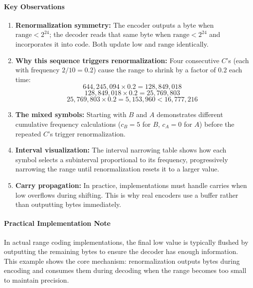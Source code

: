 \paragraph{Key Observations}

\begin{enumerate}
    \item \textbf{Renormalization symmetry:} The encoder outputs a byte when $\text{range} < 2^{24}$; the decoder reads that same byte when $\text{range} < 2^{24}$ and incorporates it into $\text{code}$. Both update $\text{low}$ and $\text{range}$ identically.
    
    \item \textbf{Why this sequence triggers renormalization:} Four consecutive $C$'s (each with frequency $2/10 = 0.2$) cause the range to shrink by a factor of $0.2$ each time:
    \[
    644{,}245{,}094 \times 0.2 = 128{,}849{,}018
    \]
    \[
    128{,}849{,}018 \times 0.2 = 25{,}769{,}803
    \]
    \[
    25{,}769{,}803 \times 0.2 = 5{,}153{,}960 < 16{,}777{,}216
    \]
    
    \item \textbf{The mixed symbols:} Starting with $B$ and $A$ demonstrates different cumulative frequency calculations ($c_B=5$ for $B$, $c_A=0$ for $A$) before the repeated $C$'s trigger renormalization.
    
    \item \textbf{Interval visualization:} The interval narrowing table shows how each symbol selects a subinterval proportional to its frequency, progressively narrowing the range until renormalization resets it to a larger value.
    
    \item \textbf{Carry propagation:} In practice, implementations must handle carries when $\text{low}$ overflows during shifting. This is why real encoders use a buffer rather than outputting bytes immediately.
\end{enumerate}


\paragraph{Practical Implementation Note}

In actual range coding implementations, the final $\text{low}$ value is typically flushed by outputting the remaining bytes to ensure the decoder has enough information. This example shows the core mechanism: renormalization outputs bytes during encoding and consumes them during decoding when the range becomes too small to maintain precision.

